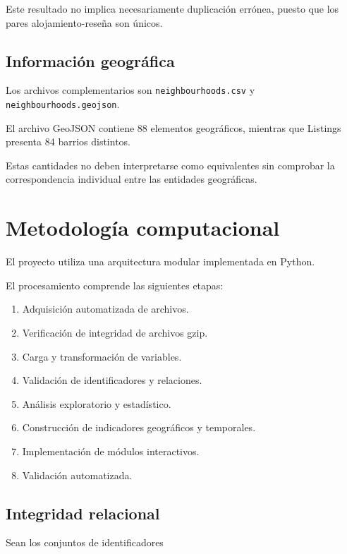 \documentclass[11pt,a4paper]{article}
\begin{document}
Este resultado no implica necesariamente duplicación
errónea, puesto que los pares alojamiento-reseña
son únicos.

\subsection{Información geográfica}

Los archivos complementarios son
\texttt{neighbourhoods.csv} y
\texttt{neighbourhoods.geojson}.

El archivo GeoJSON contiene 88 elementos geográficos,
mientras que Listings presenta 84 barrios distintos.

Estas cantidades no deben interpretarse como
equivalentes sin comprobar la correspondencia
individual entre las entidades geográficas.


\section{Metodología computacional}

El proyecto utiliza una arquitectura modular
implementada en Python.

El procesamiento comprende las siguientes etapas:

\begin{enumerate}
    \item Adquisición automatizada de archivos.
    \item Verificación de integridad de archivos gzip.
    \item Carga y transformación de variables.
    \item Validación de identificadores y relaciones.
    \item Análisis exploratorio y estadístico.
    \item Construcción de indicadores geográficos
    y temporales.
    \item Implementación de módulos interactivos.
    \item Validación automatizada.
\end{enumerate}

\subsection{Integridad relacional}

Sean los conjuntos de identificadores
\end{document}

